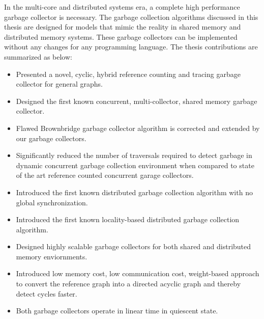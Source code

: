 In the multi-core and distributed systems era, a complete high performance garbage collector is necessary. The garbage collection algorithms discussed in this thesis are designed for models that mimic the reality in shared memory and distributed memory systems. These garbage collectors  can be implemented without any changes for any programming language. The thesis contributions are summarized as below:
\begin{itemize}
		\item Presented a novel, cyclic, hybrid reference counting and tracing  garbage collector for general graphs.
		\item Designed the first known concurrent, multi-collector, shared memory garbage collector.
		\item Flawed Brownbridge garbage collector algorithm is corrected and extended by our garbage collectors.
		\item Significantly reduced the number of traversals required to detect garbage in dynamic concurrent garbage collection environment when compared to state of the art reference counted concurrent garage collectors.
		\item Introduced the first known distributed garbage collection algorithm with no global synchronization.
		\item Introduced the first known locality-based distributed garbage collection algorithm.
		\item Designed highly scalable garbage collectors for both shared and distributed memory enviornments.
		\item Introduced low memory cost, low communication cost, weight-based approach to convert the reference graph into a directed acyclic graph and thereby detect cycles faster.
		\item Both garbage collectors operate in linear time in quiescent state.
\end{itemize}